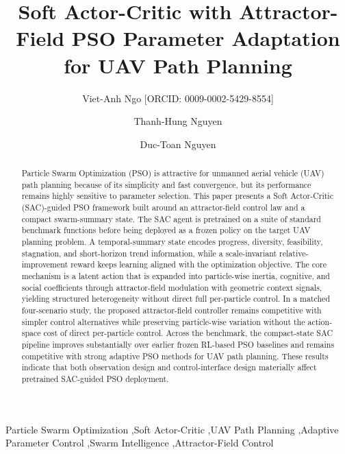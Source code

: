 \documentclass[final,5p,times]{elsarticle}
\providecommand{\orcid}[1]{\texorpdfstring{\,\href{https://orcid.org/#1}{\textcolor{ElsevierBlue}{\small[ORCID:\,#1]}}}{ [ORCID: #1]}}
\def\orcid#1{ [ORCID: #1]}%
\def\textcolor#1#2{#2}%
\def\small{}%
\begin{document}
\begin{frontmatter}
\title{Soft Actor-Critic with Attractor-Field PSO Parameter Adaptation for UAV Path Planning}
\author[aff1]{Viet-Anh Ngo\orcid{0009-0002-5429-8554}}
\author[aff1]{Thanh-Hung Nguyen}
\author[aff1,cor1]{Duc-Toan Nguyen}
\address[aff1]{School of Mechanical Engineering, Hanoi University of Science and Technology, 1A-Dai Co Viet Street, Bach Mai, Hanoi City, Viet Nam}
\begin{abstract}
Particle Swarm Optimization (PSO) is attractive for unmanned aerial vehicle (UAV) path planning because of its simplicity and fast convergence, but its performance remains highly sensitive to parameter selection.
This paper presents a Soft Actor-Critic (SAC)-guided PSO framework built around an attractor-field control law and a compact swarm-summary state.
The SAC agent is pretrained on a suite of standard benchmark functions before being deployed as a frozen policy on the target UAV planning problem.
A temporal-summary state encodes progress, diversity, feasibility, stagnation, and short-horizon trend information, while a scale-invariant relative-improvement reward keeps learning aligned with the optimization objective.
The core mechanism is a latent action that is expanded into particle-wise inertia, cognitive, and social coefficients through attractor-field modulation with geometric context signals, yielding structured heterogeneity without direct full per-particle control.
In a matched four-scenario study, the proposed attractor-field controller remains competitive with simpler control alternatives while preserving particle-wise variation without the action-space cost of direct per-particle control.
Across the benchmark, the compact-state SAC pipeline improves substantially over earlier frozen RL-based PSO baselines and remains competitive with strong adaptive PSO methods for UAV path planning.
These results indicate that both observation design and control-interface design materially affect pretrained SAC-guided PSO deployment.
\end{abstract}
\begin{keyword}
Particle Swarm Optimization \sep Soft Actor-Critic \sep UAV Path Planning \sep Adaptive Parameter Control \sep Swarm Intelligence \sep Attractor-Field Control
\end{keyword}
\end{frontmatter} 
\end{document}
